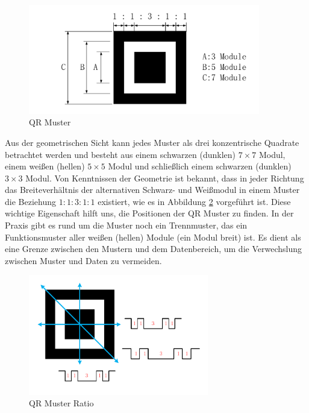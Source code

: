 \begin{figure}[H]
 \centering 
 \includegraphics[keepaspectratio,width=0.9\textwidth]{images/3_Ersteverfahren/QRMuster/QRPattern.pdf}
 \caption{QR Muster}
 \label{fig:QRPattern}
\end{figure}

Aus der geometrischen Sicht kann jedes Muster als drei konzentrische Quadrate betrachtet werden und besteht aus einem schwarzen (dunklen) $7 \times 7$ Modul, einem weißen (hellen) $5 \times 5$ Modul und schließlich einem schwarzen (dunklen) $3 \times 3$ Modul. Von Kenntnissen der Geometrie ist bekannt, dass in jeder Richtung das Breiteverhältnis der alternativen Schwarz- und Weißmodul in einem Muster die Beziehung $1:1:3:1:1$ existiert, wie es in Abbildung \ref{fig:QRPatternRatio} vorgeführt ist. Diese wichtige Eigenschaft hilft uns, die Positionen der QR Muster zu finden. In der Praxis gibt es rund um die Muster noch ein Trennmuster, das ein Funktionsmuster aller weißen (hellen) Module (ein Modul breit) ist. Es dient als eine Grenze zwischen den Mustern und dem Datenbereich, um die Verwechslung zwischen Muster und Daten zu vermeiden.
 
 \begin{figure}[H]
 \centering 
 \includegraphics[keepaspectratio,width=0.7\textwidth]{images/3_Ersteverfahren/QRMuster/QP_Patternratio.pdf}
 \caption{QR Muster Ratio}
 \label{fig:QRPatternRatio}
\end{figure}

